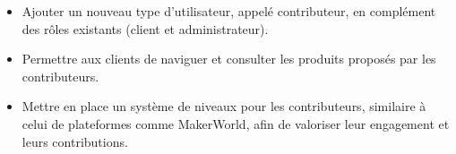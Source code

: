 \documentclass[12pt,a4paper]{article}
\begin{document}
\begin{itemize}
\item Ajouter un nouveau type d’utilisateur, appelé contributeur, en complément des rôles existants (client et administrateur).
\item Permettre aux clients de naviguer et consulter les produits proposés par les contributeurs.
\item Mettre en place un système de niveaux pour les contributeurs, similaire à celui de plateformes comme MakerWorld, afin de valoriser leur engagement et leurs contributions.
\end{itemize}
\end{document}
